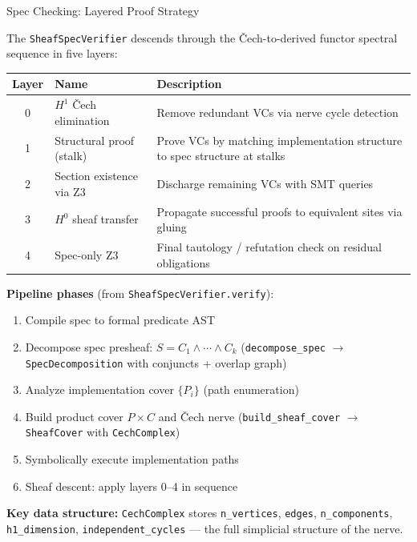 \documentclass[aspectratio=169,11pt]{beamer}
\begin{document}
\begin{frame}{Spec Checking: Layered Proof Strategy}

The \texttt{SheafSpecVerifier} descends through the \v{C}ech-to-derived
functor spectral sequence in five layers:

\vspace{0.3em}
{\small
\begin{tabular}{@{}clp{7.5cm}@{}}
\textbf{Layer} & \textbf{Name} & \textbf{Description} \\
\hline
0 & $H^1$ \v{C}ech elimination & Remove redundant VCs via nerve cycle detection \\
1 & Structural proof (stalk) & Prove VCs by matching implementation structure to spec structure at stalks \\
2 & Section existence via Z3 & Discharge remaining VCs with SMT queries \\
3 & $H^0$ sheaf transfer & Propagate successful proofs to equivalent sites via gluing \\
4 & Spec-only Z3 & Final tautology / refutation check on residual obligations \\
\end{tabular}
}

\vspace{0.4em}
\textbf{Pipeline phases} (from \texttt{SheafSpecVerifier.verify}):

{\small
\begin{enumerate}
  \item Compile spec to formal predicate AST
  \item Decompose spec presheaf: $S = C_1 \wedge \cdots \wedge C_k$
        (\texttt{decompose\_spec} $\to$ \texttt{SpecDecomposition} with conjuncts + overlap graph)
  \item Analyze implementation cover $\{P_i\}$ (path enumeration)
  \item Build product cover $P \times C$ and \v{C}ech nerve (\texttt{build\_sheaf\_cover} $\to$ \texttt{SheafCover} with \texttt{CechComplex})
  \item Symbolically execute implementation paths
  \item Sheaf descent: apply layers 0--4 in sequence
\end{enumerate}
}

\vspace{0.2em}
{\small \textbf{Key data structure:} \texttt{CechComplex} stores
\texttt{n\_vertices}, \texttt{edges}, \texttt{n\_components}, \texttt{h1\_dimension},
\texttt{independent\_cycles} — the full simplicial structure of the nerve.}

\end{frame}
\end{document}
